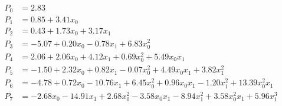 \documentclass[a4paper,12pt]{article}
\begin{document}
\begin{align*}
  P_{0} &= 2.83\\
P_{1} &= 0.85+3.41x_{0}\\
P_{2} &= 0.43+1.73x_{0}+3.17x_{1}\\
P_{3} &= -5.07+0.20x_{0}-0.78x_{1}+6.83x_{0}^{2}\\
P_{4} &= 2.06+2.06x_{0}+4.12x_{1}+0.69x_{0}^{2}+5.49x_{0}x_{1}\\
P_{5} &= -1.50+2.32x_{0}+0.82x_{1}-0.07x_{0}^{2}+4.49x_{0}x_{1}+3.82x_{1}^{2}\\
P_{6} &= -4.78+0.72x_{0}-10.76x_{1}+6.45x_{0}^{2}+0.96x_{0}x_{1}-1.20x_{1}^{2}+13.39x_{0}^{2}x_{1}\\
P_{7} &= -2.68x_{0}-14.91x_{1}+2.68x_{0}^{2}-3.58x_{0}x_{1}-8.94x_{1}^{2}+3.58x_{0}^{2}x_{1}+5.96x_{1}^{3}
\end{align*}
\end{document}
